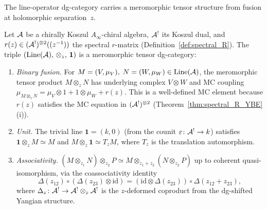 The line-operator dg-category carries a meromorphic tensor
structure from fusion at holomorphic separation~$z$.

\begin{theorem}
\label{thm:meromorphic-tensor-category}
Let $\mathcal{A}$ be a chirally Koszul $A_\infty$-chiral algebra,
$\mathcal{A}^!$ its Koszul dual, and $r(z) \in (\mathcal{A}^!)^{\otimes 2}((z^{-1}))$
the spectral $r$-matrix
\textup{(}Definition~\textup{\ref{def:spectral_R}}\textup{)}.
The triple
$(\operatorname{Line}(\mathcal{A}),\, \otimes_z,\, \mathbf{1})$
is a meromorphic tensor dg-category:
\begin{enumerate}[label=\textup{(\roman*)}]
\item \emph{Binary fusion.}
 For $M = (V, \mu_V),\; N = (W, \mu_W) \in \operatorname{Line}(\mathcal{A})$,
 the meromorphic tensor product $M \otimes_z N$ has underlying
 complex $V \otimes W$ and MC coupling
 $\mu_{M \otimes_z N} = \mu_V \otimes 1 + 1 \otimes \mu_W
 + r(z)$.
 This is a well-defined MC element because $r(z)$ satisfies the
 MC equation in $(\mathcal{A}^!)^{\otimes 2}$
 \textup{(}Theorem~\textup{\ref{thm:spectral_R_YBE}(i)}\textup{)}.

\item \emph{Unit.}
 The trivial line $\mathbf{1} = (k, 0)$
 \textup{(}from the counit $\varepsilon \colon \mathcal{A}^! \to k$\textup{)}
 satisfies $\mathbf{1} \otimes_z M \simeq M$ and
 $M \otimes_z \mathbf{1} \simeq T_z M$, where $T_z$ is the
 translation automorphism.

\item \emph{Associativity.}
 $(M \otimes_{z_1} N) \otimes_{z_2} P
 \simeq M \otimes_{z_1+z_2} (N \otimes_{z_2} P)$
 up to coherent quasi-isomorphism, via the coassociativity
 identity
 \[
 \Delta(z_{12}) \circ (\Delta(z_{23}) \otimes \mathrm{id})
 = (\mathrm{id} \otimes \Delta(z_{23})) \circ \Delta(z_{12}+z_{23}),
 \]
 where $\Delta_z \colon \mathcal{A}^! \to \mathcal{A}^! \otimes_z \mathcal{A}^!$
 is the $z$-deformed coproduct from the dg-shifted Yangian
 structure.
\end{enumerate}
\end{theorem}

